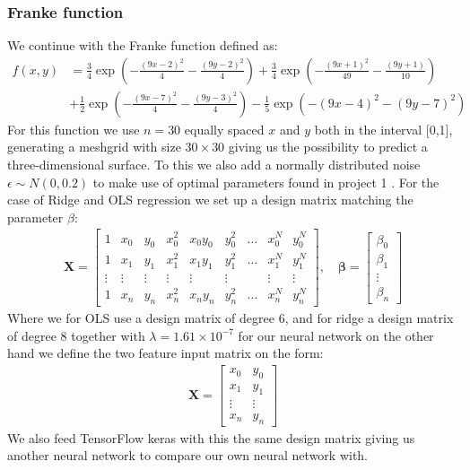 \documentclass[11pt]{article}
\begin{document}
\subsubsection*{Franke function}
We continue with the Franke function defined as:
\begin{align*}
  f(x,y) & = \frac{3}{4 }\exp\left(- \frac{(9x -2 )^2}{4} - \frac{(9y-2)^2}{4}\right) +\frac{3}{4}\exp{\left(-\frac{(9x+1)^2}{49}- \frac{(9y+1)}{10}\right)} \\
         & +\frac{1}{2}\exp{\left(-\frac{(9x-7)^2}{4} - \frac{(9y-3)^2}{4}\right)} -\frac{1}{5}\exp{\left( -(9x-4)^2 - (9y-7)^2\right) }
\end{align*}
For this function we use $n=30$ equally spaced $x$ and $y$ both in the interval [0,1], generating a meshgrid with size $30 \times 30$ giving us the possibility to predict a three-dimensional surface. To this we also add a normally distributed noise $\epsilon\sim N(0, 0.2)$ to make use of optimal parameters found in project 1 \cite{project1}. For the case of Ridge and OLS regression we set up a design matrix matching the parameter $\beta$:
\begin{align*}
  \boldsymbol{X} = \begin{bmatrix}
    1      & x_0    & y_0    & x_0^2  & x_0y_0 & y_0^2  & \hdots & x_0^N  & y_0^N  \\
    1      & x_1    & y_1    & x_1^2  & x_1y_1 & y_1^2  & \hdots & x_1^N  & y_1^N  \\
    \vdots & \vdots & \vdots & \vdots & \vdots & \vdots &        & \vdots & \vdots \\
    1      & x_n    & y_n    & x_n^2  & x_ny_n & y_n^2  & \hdots & x_n^N  & y_n^N
  \end{bmatrix}
  , \quad
  \boldsymbol{\beta} =
  \begin{bmatrix}
    \beta_0 \\
    \beta_1 \\
    \vdots  \\
    \beta_n
  \end{bmatrix}
\end{align*}
Where we for OLS use a design matrix of degree 6, and for ridge a design matrix of degree 8 together with $\lambda = 1.61 \times10^{-7}$
for our neural network on the other hand we define the two feature input matrix on the form:
\begin{align*}
  \boldsymbol{X} =
  \begin{bmatrix}
    x_0      & y_0    \\
    x_1      & y_1    \\
    \vdots\  & \vdots \\
    x_n      & y_n
  \end{bmatrix}
\end{align*}
We also feed TensorFlow keras with this the same design matrix giving us another neural network to compare our own neural network with.
\end{document}
